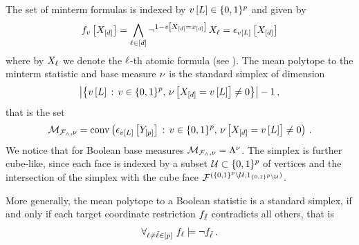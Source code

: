 \begin{example}
    \label{exa:mintermHLNSet}
    The set of minterm formulas is indexed by $v\left[L\right]\in\{0,1\}^{p}$ and given by
    \begin{align*}
        f_{v}\left[X_{[d]}\right]
        = \bigwedge_{\ell\in[d]} \lnot^{1-v\left[X_{[d]}=x_{[d]}\right]} \, X_{\ell}
        = \epsilon_{v\left[L\right]}\left[X_{[d]}\right]
    \end{align*}
    where by $X_{\ell}$ we denote the $\ell$-th atomic formula (see ).
    The mean polytope to the minterm statistic and base measure $\nu$ is the standard simplex of dimension
    \begin{align*}
        \left|\left\{v\left[L\right]\,:\,v\in\{0,1\}^{p},\,\nu\left[X_{[d]}=v\left[L\right]\right]\neq 0\right\}\right|-1 \, ,
    \end{align*}
    that is the set
    \begin{align*}
        \mathcal{M}_{\mathcal{F}_{\land},\nu}
        = \mathrm{conv}\left(\epsilon_{v\left[L\right]}\left[Y_{[p]}\right]\,:\,v\in\{0,1\}^{p},\,\nu\left[X_{[d]}=v\left[L\right]\right]\neq 0\right) \, .
    \end{align*}
    We notice that for Boolean base measures $\mathcal{M}_{\mathcal{F}_{\land},\nu}=\Lambda^{\nu}$.
    The simplex is further cube-like, since each face is indexed by a subset $\mathcal{U}\subset\{0,1\}^{p}$ of vertices and the intersection of the simplex with the cube face
    $\mathcal{F}^{(\{0,1\}^p\backslash\mathcal{U},1_{\{0,1\}^p\backslash\mathcal{U}})}$.





    More generally, the mean polytope to a Boolean statistic is a standard simplex, if and only if each target coordinate restriction $f_{\tilde{\ell}}$ contradicts all others, that is
    \begin{align*}
        \forall_{\ell\neq\tilde{\ell}\in[p]} \,\, {f_{\ell}\models\lnot f_{\tilde{\ell}}} \, .
    \end{align*}
\end{example}
